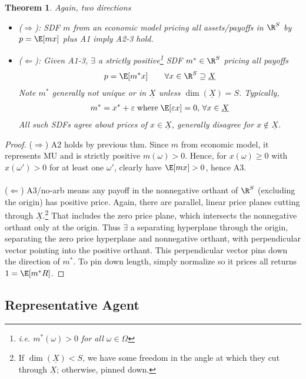 \documentclass[12pt]{article}
\theoremstyle{plain}
\newtheorem{thm}{Theorem}[section]
\theoremstyle{definition}
\theoremstyle{remark}
\begin{document}
\begin{multicols*}{2}
\begin{thm}
Again, two directions
\begin{itemize}
  \item \emph{($\Rightarrow$):}
    SDF $m$ from an economic model pricing all assets/payoffs
    in $\R^S$ by $p=\E[mx]$ plus A1 imply A2-3 hold.
  \item
    \emph{($\Leftarrow$):}
    Given A1-3, $\exists$ a
    \emph{strictly positive}\footnote{
      i.e. $m^*(\omega)>0$ for all $\omega\in\Omega$
    }
    SDF $m^*\in\R^S$ pricing all payoffs
    \begin{align*}
      p=\E[m^*x]
      \qquad
      \forall
      x\in \R^S\supseteq \underline{X}
    \end{align*}
    Note $m^*$ generally not unique or in $\underline{X}$ unless
    $\dim(\underline{X})=S$.
    Typically,
    \begin{align*}
      m^*=x^*+\varepsilon
      \;\text{where}\;
      \E[\varepsilon x]=0,\,
      \forall x\in\underline{X}
    \end{align*}
    All such SDFs agree about prices of
    $x\in\underline{X}$, generally disagree for
    $x\not\in\underline{X}$.
\end{itemize}
\end{thm}
\begin{proof}
($\Rightarrow$)
A2 holds by previous thm.
Since $m$ from economic model, it represents MU and is strictly
positive $m(\omega)>0$. Hence, for $x(\omega)\geq 0$ with $x(\omega')>0$
for at least one $\omega'$, clearly have $\E[mx]>0$, hence A3.
\\
\\
($\Leftarrow$)
A3/no-arb means any payoff in the nonnegative orthant of
$\R^S$ (excluding the origin) has positive price.
Again, there are parallel, linear price planes cutting through
$\underline{X}$.\footnote{%
  If $\dim(\underline{X})<S$, we have some freedom in the angle at which
  they cut through $\underline{X}$; otherwise, pinned down.
}
That includes the zero price plane, which intersects the nonnegative
orthant only at the origin. Thus $\exists$ a separating hyperplane
through the origin, separating the zero price hyperplane and
nonnegative orthant, with perpendicular vector pointing into the
positive orthant. This perpendicular vector pins down the direction of
$m^*$. To pin down length, simply normalize so it prices all returns
$1=\E[m^*R]$.
\end{proof}

\clearpage
\subsection{Representative Agent}


\end{multicols*}
\end{document}

